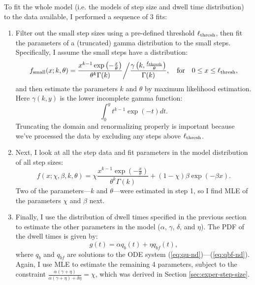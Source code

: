 \documentclass{article}
\newcommand{\tn}{\textnormal}
\begin{document}
To fit the whole model (i.e. the models of step size and dwell time
distribution) to the data available, I performed a sequence of 3 fits:
\begin{enumerate}
\item Filter out the small step sizes using a pre-defined threshold
  $\ell_\tn{thresh}$, then fit the parameters of a (truncated) gamma
  distribution to the small steps. Specifically, I assume the small
  steps have a distribution:
  \begin{equation}
    f_\tn{small}(x; k, \theta) = \frac{x^{k-1}
      \exp\left(-\frac{x}{\theta}\right)}{\theta^k
      \Gamma(k)} \bigg/ \frac{\gamma\left(k,
        \frac{\ell_\tn{thresh}}{\theta}\right)}{\Gamma(k)}, \quad
    \tn{for} \quad 0 \le x \le \ell_\tn{thresh},
    \label{eq:small-step-pdf-gamma}
  \end{equation}
  and then estimate the parameters $k$ and $\theta$ by maximum
  likelihood estimation. Here $\gamma(k, y)$ is the lower incomplete
  gamma function:
  \begin{equation*}
    \int_{0}^{y} t^{k-1} \exp(-t) dt.
  \end{equation*}
  Truncating the domain and renormalizing
  properly is important because we've processed the data by excluding
  any steps above $\ell_\tn{thresh}$.
\item Next, I look at all the step data and fit parameters in the
  model distribution of all step sizes:
  \begin{equation}
    \label{eq:step-pdf-gamma}
    f(x; \chi, \beta, k, \theta) = \chi \frac{x^{k-1}
      \exp\left(-\frac{x}{\theta}\right)}{\theta^k \Gamma(k)} + (1 -
    \chi) \beta \exp(-\beta x).
  \end{equation}
  Two of the parameters---$k$ and $\theta$---were estimated in step 1,
  so I find MLE of the parameters $\chi$ and $\beta$ next.
\item Finally, I use the distribution of dwell times specified in the
  previous section to estimate the other parameters in the model
  ($\alpha$, $\gamma$, $\delta$, and $\eta$). The PDF of the dwell
  times is given by:
  \begin{equation}
    \label{eq:dwell-pdf}
    g(t) = \alpha q_b(t) + \eta q_{bf}(t),
  \end{equation}
  where $q_b$ and $q_{bf}$ are solutions to the ODE system
  (\ref{eq:qu-nd})---(\ref{eq:qbf-nd}). Again, I use MLE to estimate
  the remaining 4 parameters, subject to the constraint
  $\frac{\alpha (\gamma + \eta)}{\alpha (\gamma + \eta) + \delta \eta}
  = \chi$, which was derived in Section \ref{sec:exper-step-size}.
\end{enumerate}
\end{document}
